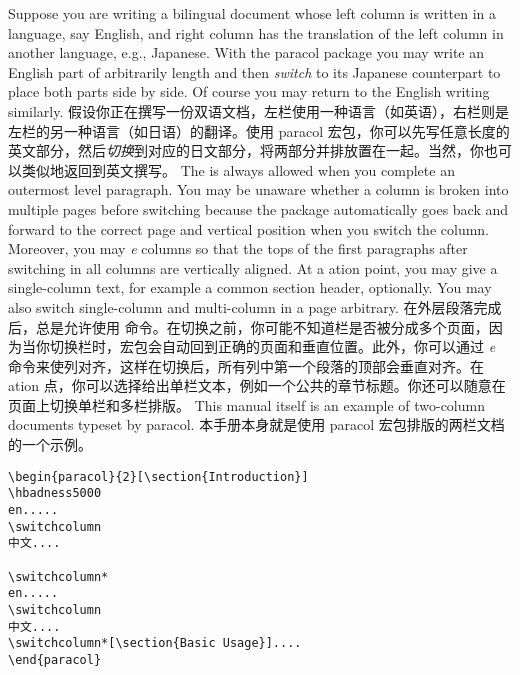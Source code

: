  \begin{paracol}{2}

 \switchcolumn
 
 \switchcolumn*
 Suppose you are writing a bilingual document whose left column is written in
 a language, say English, and right column has the translation of the left
 column in another language, e.g., Japanese.  With the \textsf{paracol}
 package you may write an English part of arbitrarily length and then {\em
 switch} to its Japanese counterpart to place both parts side by side.  Of
 course you may return to the English writing similarly.
 \switchcolumn
 假设你正在撰写一份双语文档，左栏使用一种语言（如英语），右栏则是左栏的另一种语言（如日语）的翻译。使用 \textsf{paracol} 宏包，你可以先写任意长度的英文部分，然后{\em 切换}到对应的日文部分，将两部分并排放置在一起。当然，你也可以类似地返回到英文撰写。
 \switchcolumn*
 The {\em\Uidx\cswitch} is always allowed when you complete an outermost
 level paragraph.  You may be unaware whether a column is broken into
 multiple pages before switching because the package automatically goes
 back and forward to the correct page and vertical position when you switch
 the column.  Moreover, you may {\em\Uidx\sync{}e} columns so that the tops
 of the first paragraphs after switching in all columns are vertically
 aligned.  At a \sync{}ation point, you may give a single-column text,
 for example a common section header, optionally.  You may also switch
 single-column and multi-column in a page arbitrary.
 \switchcolumn
 在外层段落完成后，总是允许使用 {\em\Uidx\cswitch} 命令。在切换之前，你可能不知道栏是否被分成多个页面，因为当你切换栏时，宏包会自动回到正确的页面和垂直位置。此外，你可以通过 {\em\Uidx\sync{}e} 命令来使列对齐，这样在切换后，所有列中第一个段落的顶部会垂直对齐。在 \sync{}ation 点，你可以选择给出单栏文本，例如一个公共的章节标题。你还可以随意在页面上切换单栏和多栏排版。
 \switchcolumn*
 This manual itself is an example of two-column documents typeset by
 \textsf{paracol}.  
 \switchcolumn
 本手册本身就是使用 \textsf{paracol} 宏包排版的两栏文档的一个示例。

 \end{paracol}
\begin{Verbatim}
\begin{paracol}{2}[\section{Introduction}]
\hbadness5000
en.....
\switchcolumn
中文....

\switchcolumn*
en.....
\switchcolumn
中文....
\switchcolumn*[\section{Basic Usage}]....
\end{paracol}
 \end{Verbatim}